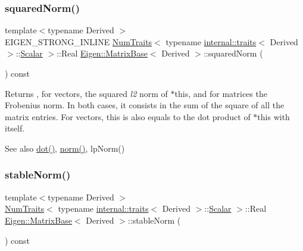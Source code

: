\subsubsection{\texorpdfstring{squaredNorm()}{squaredNorm()}}
{\footnotesize\ttfamily template$<$typename Derived $>$ \\
E\+I\+G\+E\+N\+\_\+\+S\+T\+R\+O\+N\+G\+\_\+\+I\+N\+L\+I\+NE \mbox{\hyperlink{struct_eigen_1_1_num_traits}{Num\+Traits}}$<$ typename \mbox{\hyperlink{struct_eigen_1_1internal_1_1traits}{internal\+::traits}}$<$ Derived $>$\+::\mbox{\hyperlink{class_eigen_1_1_dense_base_a5feed465b3a8e60c47e73ecce83e39a2}{Scalar}} $>$\+::Real \mbox{\hyperlink{class_eigen_1_1_matrix_base}{Eigen\+::\+Matrix\+Base}}$<$ Derived $>$\+::squared\+Norm (\begin{DoxyParamCaption}{ }\end{DoxyParamCaption}) const}

\begin{DoxyReturn}{Returns}
, for vectors, the squared {\itshape l2} norm of {\ttfamily $\ast$this}, and for matrices the Frobenius norm. In both cases, it consists in the sum of the square of all the matrix entries. For vectors, this is also equals to the dot product of {\ttfamily $\ast$this} with itself.
\end{DoxyReturn}
\begin{DoxySeeAlso}{See also}
\mbox{\hyperlink{class_eigen_1_1_matrix_base_a2c84258ecc93fc1a0a2d4fa22b99dd99}{dot()}}, \mbox{\hyperlink{class_eigen_1_1_matrix_base_a5f6a3bc46add1f2e879ce15040e6987e}{norm()}}, lp\+Norm() 
\end{DoxySeeAlso}
\mbox{\label{class_eigen_1_1_matrix_base_ab84d3e64f855813b1eea4202c0697dc1}} 
\subsubsection{\texorpdfstring{stableNorm()}{stableNorm()}}
{\footnotesize\ttfamily template$<$typename Derived $>$ \\
\mbox{\hyperlink{struct_eigen_1_1_num_traits}{Num\+Traits}}$<$ typename \mbox{\hyperlink{struct_eigen_1_1internal_1_1traits}{internal\+::traits}}$<$ Derived $>$\+::\mbox{\hyperlink{class_eigen_1_1_dense_base_a5feed465b3a8e60c47e73ecce83e39a2}{Scalar}} $>$\+::Real \mbox{\hyperlink{class_eigen_1_1_matrix_base}{Eigen\+::\+Matrix\+Base}}$<$ Derived $>$\+::stable\+Norm (\begin{DoxyParamCaption}{ }\end{DoxyParamCaption}) const\hspace{0.3cm}{\ttfamily [inline]}}

